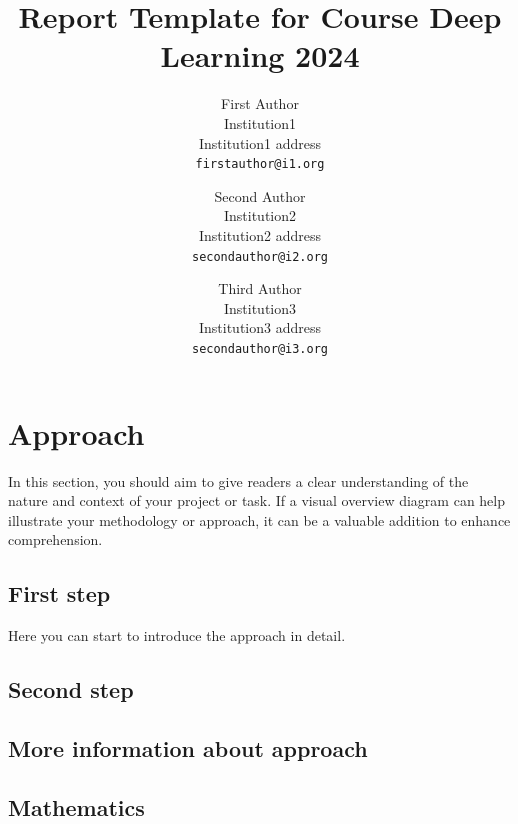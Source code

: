 \documentclass[10pt,twocolumn,letterpaper]{article}
\begin{document}
\title{Report Template for Course Deep Learning 2024}

\author{First Author\\
Institution1\\
Institution1 address\\
{\tt\small firstauthor@i1.org}
\and
Second Author\\
Institution2\\
Institution2 address\\
{\tt\small secondauthor@i2.org}
\and
Third Author\\
Institution3\\
Institution3 address\\
{\tt\small secondauthor@i3.org}
}
\maketitle


\section{Approach}
\label{sec:Appr}
In this section, you should aim to give readers a clear understanding of the nature and context of your project or task. If a visual overview diagram can help illustrate your methodology or approach, it can be a valuable addition to enhance comprehension.

\subsection{First step}
Here you can start to introduce the approach in detail. 

\subsection{Second step}

\subsection{More information about approach}

\subsection{Mathematics}
\end{document}
